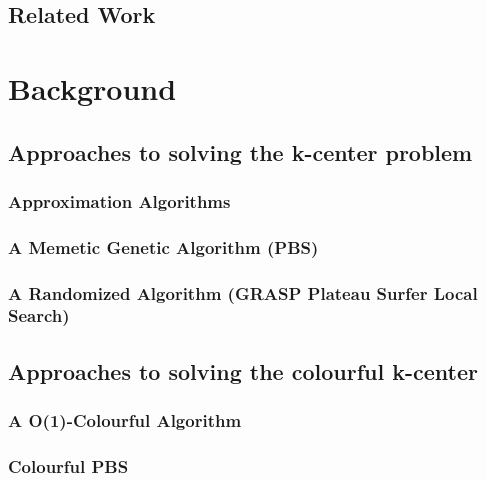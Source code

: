 \documentclass{article}
\begin{document}
    \subsection{Related Work}
    

\section{Background}\label{section:background}
    \subsection{Approaches to solving the k-center problem}\label{subsection:approaches_k_center}
    

        \subsubsection{Approximation Algorithms}\label{section:greedy}
        
        
        \subsubsection{A Memetic Genetic Algorithm (PBS)}\label{section:pbs}
        
        
        \subsubsection{A Randomized Algorithm (GRASP Plateau Surfer Local Search)}\label{section:plateau_surfer}
        

    \subsection{Approaches to solving the colourful k-center}\label{subsection:approaches_colourful_k_center}
    

        \subsubsection{A O(1)-Colourful Algorithm}\label{section:constant_colourful_k_center}
        
        
        \subsubsection{Colourful PBS}\label{section:colourful_pbs}
        
\end{document}
